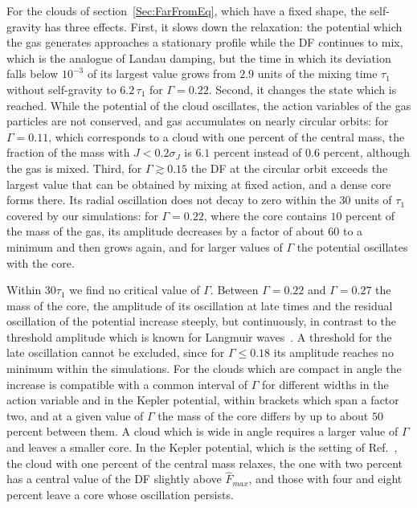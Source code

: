 For the clouds of section~\ref{Sec:FarFromEq}, which have a fixed shape, the self-gravity has three effects. First, it slows down the relaxation: the potential which the gas generates approaches a stationary profile while the DF continues to mix, which is the analogue of Landau damping, but the time in which its deviation falls below $10^{-3}$ of its largest value grows from $2.9$ units of the mixing time $\tau_1$ without self-gravity to $6.2\,\tau_1$ for $\Gamma = 0.22$. Second, it changes the state which is reached. While the potential of the cloud oscillates, the action variables of the gas particles are not conserved, and gas accumulates on nearly circular orbits: for $\Gamma = 0.11$, which corresponds to a cloud with one percent of the central mass, the fraction of the mass with $J < 0.2\sigma_J$ is $6.1$ percent instead of $0.6$ percent, although the gas is mixed. Third, for $\Gamma\gtrsim 0.15$ the DF at the circular orbit exceeds the largest value that can be obtained by mixing at fixed action, and a dense core forms there. Its radial oscillation does not decay to zero within the $30$ units of $\tau_1$ covered by our simulations: for $\Gamma = 0.22$, where the core contains $10$ percent of the mass of the gas, its amplitude decreases by a factor of about $60$ to a minimum and then grows again, and for larger values of $\Gamma$ the potential oscillates with the core.

Within $30\tau_1$ we find no critical value of $\Gamma$. Between $\Gamma = 0.22$ and $\Gamma = 0.27$ the mass of the core, the amplitude of its oscillation at late times and the residual oscillation of the potential increase steeply, but continuously, in contrast to the threshold amplitude which is known for Langmuir waves~\cite{cLjD98,aIiC06}. A threshold for the late oscillation cannot be excluded, since for $\Gamma\leq 0.18$ its amplitude reaches no minimum within the simulations. For the clouds which are compact in angle the increase is compatible with a common interval of $\Gamma$ for different widths in the action variable and in the Kepler potential, within brackets which span a factor two, and at a given value of $\Gamma$ the mass of the core differs by up to about $50$ percent between them. A cloud which is wide in angle requires a larger value of $\Gamma$ and leaves a smaller core. In the Kepler potential, which is the setting of Ref.~\cite{sCjL26}, the cloud with one percent of the central mass relaxes, the one with two percent has a central value of the DF slightly above $\hat{F}_{max}$, and those with four and eight percent leave a core whose oscillation persists.

